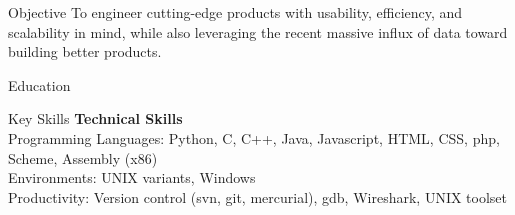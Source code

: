 \documentclass{resume}
\begin{document}
\maketitle
\thispagestyle{empty} %

\begin{component}{Objective}
To engineer cutting-edge products with usability, efficiency, and scalability in mind, while also leveraging
the recent massive influx of data toward building better products. \\
\end{component}

\begin{component}{Education}
\end{component}

\vspace{1.0em}

\begin{component}{Key Skills}
	\textbf{Technical Skills}\\
		Programming Languages: Python, C, C++, Java, Javascript, HTML, CSS, php, Scheme, Assembly (x86)\\
		Environments: UNIX variants, Windows\\
		Productivity: Version control (svn, git, mercurial), gdb, Wireshark, UNIX toolset
\end{component}

\vspace{1.0em}
\end{document}
